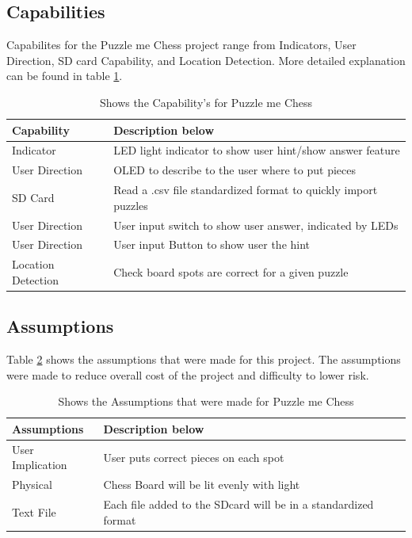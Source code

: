 \documentclass[11pt]{article}
\begin{document}
\subsection{Capabilities}
Capabilites for the Puzzle me Chess project range from Indicators, User Direction, SD card Capability, and Location Detection. More detailed explanation can be found in table \ref{tab:capability}.

\begin{table}[H]
\begin{center}
    \begin{tabular}{| l | l |}
    \hline
    Capability  & Description below\\ \hline
    Indicator &  LED light indicator to show user hint/show answer feature \\ \hline
    User Direction & OLED to describe to the user where to put pieces \\ \hline 
    SD Card & Read a .csv file standardized format to quickly import puzzles \\ \hline
    User Direction & User input switch to show user answer, indicated by LEDs \\ \hline
    User Direction & User input Button to show user the hint \\ \hline
    Location Detection & Check board spots are correct for a given puzzle  \\ \hline
    \end{tabular}
    \caption{Shows the Capability's for Puzzle me Chess}
	\label{tab:capability}
\end{center}
\end{table}

\subsection{Assumptions}
Table \ref{tab:Assumptions} shows the assumptions that were made for this project. The assumptions were made to reduce overall cost of the project and difficulty to lower risk. 

\begin{table}[H]
\begin{center}
    \begin{tabular}{| l | l |}
    \hline
    Assumptions & Description below\\ \hline
    User Implication  & User puts correct pieces on each spot \\ \hline
    Physical &  Chess Board will be lit evenly with light  \\ \hline
    Text File & Each file added to the SDcard will be in a standardized format \\ \hline     
    \end{tabular}
    \caption{Shows the Assumptions that were made for Puzzle me Chess}
	\label{tab:Assumptions}
\end{center}
\end{table}
\end{document}
